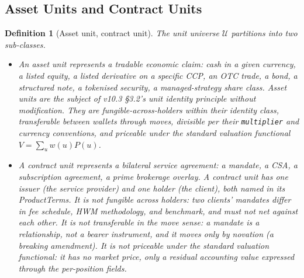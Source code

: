\documentclass[11pt,a4paper]{article}
\newtheorem{definition}{Definition}[section]
\begin{document}
\subsection{Asset Units and Contract Units}
\label{sec:contract-units}

\begin{definition}[Asset unit, contract unit]
\label{def:unitclasses}
The unit universe $\mathcal{U}$ partitions into two sub-classes.
\begin{itemize}[leftmargin=*,nosep]
\item An \emph{asset unit} represents a tradable economic claim: cash in a given currency, a listed equity, a listed derivative on a specific CCP, an OTC trade, a bond, a structured note, a tokenised security, a managed-strategy share class. Asset units are the subject of v10.3 \S 3.2's unit identity principle without modification. They are fungible-across-holders within their identity class, transferable between wallets through moves, divisible per their \texttt{multiplier} and currency conventions, and priceable under the standard valuation functional $V = \sum_u w(u) P(u)$.

\item A \emph{contract unit} represents a bilateral service agreement: a mandate, a CSA, a subscription agreement, a prime brokerage overlay. A contract unit has one issuer (the service provider) and one holder (the client), both named in its \textit{ProductTerms}. It is \emph{not} fungible across holders: two clients' mandates differ in fee schedule, HWM methodology, and benchmark, and must not net against each other. It is \emph{not} transferable in the move sense: a mandate is a relationship, not a bearer instrument, and it moves only by novation (a breaking amendment). It is \emph{not} priceable under the standard valuation functional: it has no market price, only a residual accounting value expressed through the per-position fields.
\end{itemize}
\end{definition}
\end{document}
